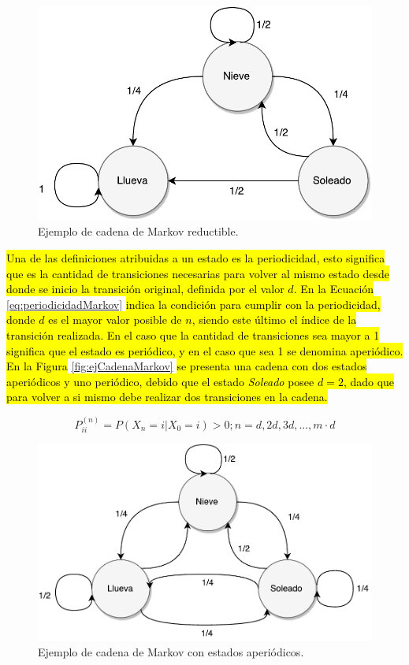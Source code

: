 \begin{figure}[ht!]
	\centering
	\includegraphics[scale=0.5]{images/EjCadenaMarkov-Reductible.pdf}
	\caption{Ejemplo de cadena de Markov reductible.}
	\label{fig:ejCadenaMarkov-Reductible}
\end{figure}

\hl{Una de las definiciones atribuidas a un estado es la periodicidad, esto significa que es la cantidad de transiciones necesarias para volver al mismo estado desde donde se inicio la transición original, definida por el valor $d$. En la Ecuación} \ref{eq:periodicidadMarkov} \hl{indica la condición para cumplir con la periodicidad, donde $d$ es el mayor valor posible de $n$, siendo este último el índice de la transición realizada. En el caso que la cantidad de transiciones sea mayor a 1 significa que el estado es periódico, y en el caso que sea 1 se denomina aperiódico. En la Figura} \ref{fig:ejCadenaMarkov} \hl{se presenta una cadena con dos estados aperiódicos y uno periódico, debido que el estado \textit{Soleado} posee $d=2$, dado que para volver a si mismo debe realizar dos transiciones en la cadena.}

\begin{equation} \label{eq:periodicidadMarkov}
	P_{ii}^{(n)} = P(X_n = i | X_0 = i) > 0 ; n = {d,2d,3d,..., m·d}
\end{equation}

\begin{figure}[ht!]
	\centering
	\includegraphics[scale=0.5]{images/EjCadenaMarkov-Aperiodica.pdf}
	\caption{Ejemplo de cadena de Markov con estados aperiódicos.}
	\label{fig:ejCadenaMarkov-Aperiodica}
\end{figure}

